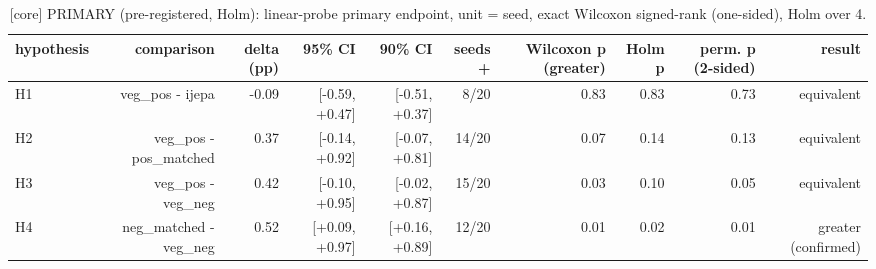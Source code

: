 \begin{table}[t]
\centering
\small
\caption{[core] PRIMARY (pre-registered, Holm): linear-probe primary endpoint, unit = seed, exact Wilcoxon signed-rank (one-sided), Holm over 4.}
\label{tab:primary_comparisons}
\begin{tabular}{lrrrrrrrrr}
\toprule
hypothesis & comparison & delta (pp) & 95\% CI & 90\% CI & seeds + & Wilcoxon p (greater) & Holm p & perm. p (2-sided) & result \\
\midrule
H1 & veg\_pos - ijepa & -0.09 & [-0.59, +0.47] & [-0.51, +0.37] & 8/20 & 0.83 & 0.83 & 0.73 & equivalent \\
H2 & veg\_pos - pos\_matched & 0.37 & [-0.14, +0.92] & [-0.07, +0.81] & 14/20 & 0.07 & 0.14 & 0.13 & equivalent \\
H3 & veg\_pos - veg\_neg & 0.42 & [-0.10, +0.95] & [-0.02, +0.87] & 15/20 & 0.03 & 0.10 & 0.05 & equivalent \\
H4 & neg\_matched - veg\_neg & 0.52 & [+0.09, +0.97] & [+0.16, +0.89] & 12/20 & 0.01 & 0.02 & 0.01 & greater (confirmed) \\
\bottomrule
\end{tabular}
\end{table}
